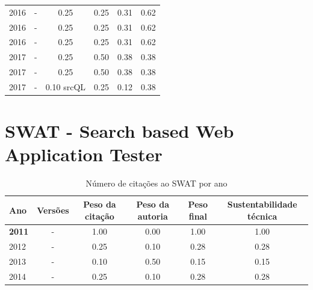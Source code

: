 \begin{table}[H]
\begin{tabular}{| l | c | c | c | c | c |}
            2016
          &
          -
          &
          0.25
          &
          0.25
          &
          0.31
          &
            {\color{blue} 0.62}
          \\
            2016
          &
          -
          &
          0.25
          &
          0.25
          &
          0.31
          &
            {\color{blue} 0.62}
          \\
            2016
          &
          -
          &
          0.25
          &
          0.25
          &
          0.31
          &
            {\color{blue} 0.62}
          \\
\hline
            2017
          &
          -
          &
          0.25
          &
          0.50
          &
          0.38
          &
            {\color{red} 0.38}
          \\
            2017
          &
          -
          &
          0.25
          &
          0.50
          &
          0.38
          &
            {\color{red} 0.38}
          \\
            2017
          &
          -
          &
          0.10
            {\tiny srcQL}
          &
          0.25
          &
          0.12
          &
            {\color{red} 0.38}
          \\
\hline
\end{tabular}
\end{table}



\section{SWAT - Search based Web Application Tester}


\begin{table}[H]
\caption{Número de citações ao SWAT  por ano}
\centering
\begin{tabular}{| l | c | c | c | c | c |}
  \hline
  Ano & Versões & Peso da citação & Peso da autoria & Peso final & Sustentabilidade técnica \\
  \hline
            {\bf 2011}
          &
          -
          &
          1.00
          &
          0.00
          &
          1.00
          &
            {\color{blue} 1.00}
          \\
\hline
            2012
          &
          -
          &
          0.25
          &
          0.10
          &
          0.28
          &
            {\color{red} 0.28}
          \\
\hline
            2013
          &
          -
          &
          0.10
          &
          0.50
          &
          0.15
          &
            {\color{red} 0.15}
          \\
\hline
            2014
          &
          -
          &
          0.25
          &
          0.10
          &
          0.28
          &
            {\color{red} 0.28}
          \\
\hline
\end{tabular}
\end{table}



